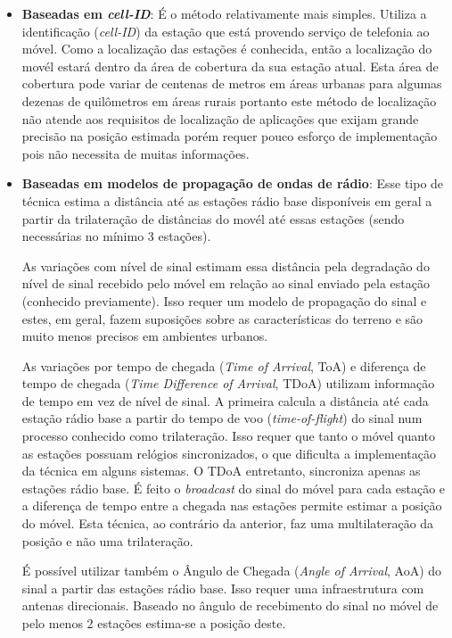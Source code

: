\documentclass[12pt]{article}
\begin{document}
        \begin{itemize}

        \item{\textbf{Baseadas em \textit{cell-ID}}}: É o método relativamente mais simples. Utiliza a identificação (\textit{cell-ID}) da estação que está provendo serviço de telefonia ao móvel. Como a localização das estações é conhecida, então a localização do movél estará dentro da área de cobertura da sua estação atual. Esta área de cobertura pode variar de centenas de metros em áreas urbanas para algumas dezenas de quilômetros em áreas rurais portanto este método de localização não atende aos requisitos de localização de aplicações que exijam grande precisão na posição estimada porém requer pouco esforço de implementação pois não necessita de muitas informações.  
    
        \item{\textbf{Baseadas em modelos de propagação de ondas de rádio}}: Esse tipo de técnica estima a distância até as estações rádio base disponíveis em geral a partir da trilateração de distâncias do movél até essas estações (sendo necessárias no mínimo 3 estações). 
        
        As variações com nível de sinal estimam essa distância pela degradação do nível de sinal recebido pelo móvel em relação ao sinal enviado pela estação (conhecido previamente). Isso requer um modelo de propagação do sinal e estes, em geral, fazem suposições sobre as características do terreno e são muito menos precisos em ambientes urbanos.
        
        As variações por tempo de chegada (\textit{Time of Arrival}, ToA) e diferença de tempo de chegada (\textit{Time Difference of Arrival}, TDoA) utilizam informação de tempo em vez de nível de sinal. A primeira calcula a distância até cada estação rádio base a partir do tempo de voo (\textit{time-of-flight}) do sinal num processo conhecido como trilateração. Isso requer que tanto o móvel quanto as estações possuam relógios sincronizados, o que dificulta a implementação da técnica em alguns sistemas. O TDoA entretanto, sincroniza apenas as estações rádio base. É feito o \textit{broadcast} do sinal do móvel para cada estação e a diferença de tempo entre a chegada nas estações permite estimar a posição do móvel. Esta técnica, ao contrário da anterior, faz uma multilateração da posição e não uma trilateração.  
         
        É possível utilizar também o Ângulo de Chegada (\textit{Angle of Arrival}, AoA) do sinal a partir das estações rádio base. Isso requer uma infraestrutura com antenas direcionais. Baseado no ângulo de recebimento do sinal no móvel de pelo menos 2 estações estima-se a posição deste.
    

\end{itemize}
\end{document}

